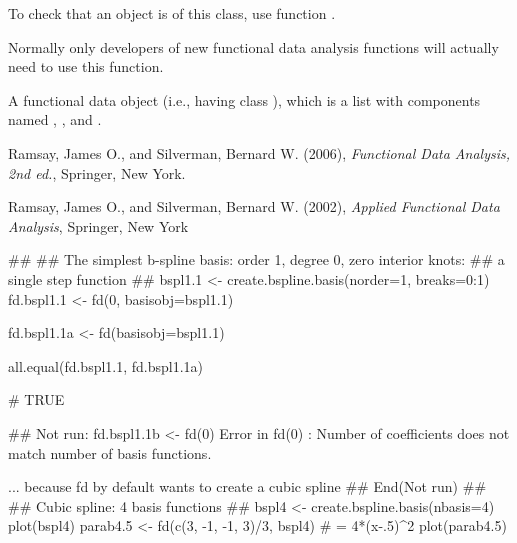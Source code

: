 \documentclass{article}
\begin{document}
\begin{Details}\relax
To check that an object is of this class, use function
.

Normally only developers of new functional data analysis
functions will actually need to use this function.
\end{Details}
\begin{Value}
A functional data object (i.e., having class ), which is a
list with components named , , and
.
\end{Value}
\begin{Source}\relax
Ramsay, James O., and Silverman, Bernard W. (2006), \emph{Functional
Data Analysis, 2nd ed.}, Springer, New York.

Ramsay, James O., and Silverman, Bernard W. (2002), \emph{Applied
Functional Data Analysis}, Springer, New York
\end{Source}
\begin{SeeAlso}\relax
{} 
\end{SeeAlso}
\begin{Examples}
\begin{ExampleCode}
##
## The simplest b-spline basis:  order 1, degree 0, zero interior knots:  
##       a single step function 
##
bspl1.1 <- create.bspline.basis(norder=1, breaks=0:1)
fd.bspl1.1 <- fd(0, basisobj=bspl1.1)

fd.bspl1.1a <- fd(basisobj=bspl1.1)

all.equal(fd.bspl1.1, fd.bspl1.1a)

# TRUE

## Not run: 
fd.bspl1.1b <- fd(0)
Error in fd(0) : 
  Number of coefficients does not match number of basis functions.

... because fd by default wants to create a cubic spline 
## End(Not run)
##
## Cubic spline:  4  basis functions 
##
bspl4 <- create.bspline.basis(nbasis=4)
plot(bspl4) 
parab4.5 <- fd(c(3, -1, -1, 3)/3, bspl4)
# = 4*(x-.5)^2
plot(parab4.5) 

\end{ExampleCode}
\end{Examples}
\end{document}
